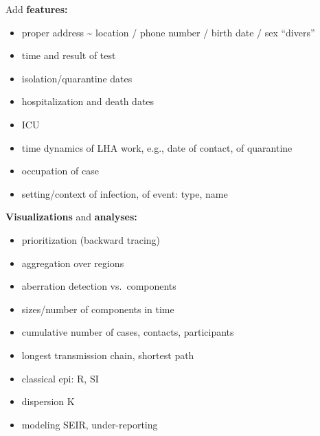 \documentclass[
  8pt,
  ignorenonframetext,
]{beamer}
\providecommand{\tightlist}{%
  \setlength{\itemsep}{0pt}\setlength{\parskip}{0pt}}
\begin{document}
\begin{frame}
Add \textbf{features:}

\begin{itemize}
\tightlist
\item
  proper address \textasciitilde{} location / phone number / birth date
  / sex ``divers''
\item
  time and result of test
\item
  isolation/quarantine dates
\item
  hospitalization and death dates
\item
  ICU
\item
  time dynamics of LHA work, e.g., date of contact, of quarantine
\item
  occupation of case
\item
  setting/context of infection, of event: type, name
\end{itemize}
\end{frame}

\begin{frame}
\textbf{Visualizations} and \textbf{analyses:}

\begin{itemize}
\tightlist
\item
  prioritization (backward tracing)
\item
  aggregation over regions
\item
  aberration detection vs.~components
\item
  sizes/number of components in time
\item
  cumulative number of cases, contacts, participants
\item
  longest transmission chain, shortest path
\item
  classical epi: R, SI
\item
  dispersion K
\item
  modeling SEIR, under-reporting
\end{itemize}
\end{frame}
\end{document}
